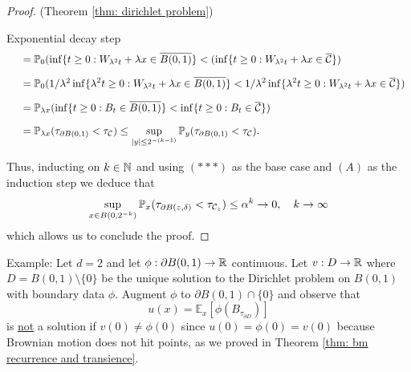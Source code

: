 \documentclass{article}
\begin{document}
\begin{proof}{(Theorem \ref{thm: dirichlet problem})}
\begin{examplesblock}{Exponential decay step}
\[\begin{array}{ll}
& = \mathbb{P}_{0}(\displaystyle\inf\{t\geq 0: W_{\lambda^{2}t}+\lambda x \in \overline{B(0, 1)}\}<(\displaystyle\inf\{t\geq 0: W_{\lambda^{2}t} + \lambda x \in \overline{ \mathcal{C}}\}) \\[10pt]
& = \mathbb{P}_{0}(1/\lambda^{2}\displaystyle\inf\{\lambda^{2}t\geq 0: W_{\lambda^{2}t}+\lambda x \in \overline{B(0, 1)}\}<1/\lambda^{2}\displaystyle\inf\{\lambda^{2}t\geq 0: W_{\lambda^{2}t} + \lambda x \in \overline{ \mathcal{C}}\}) \\[10pt]
& = \mathbb{P}_{\lambda x}(\displaystyle\inf\{t\geq 0: B_{t} \in \overline{B(0, 1)}\}<\displaystyle\inf\{t\geq 0: B_{t}\in \overline{ \mathcal{C}}\}) \\[10pt]
& = \mathbb{P}_{\lambda x}(\tau_{\partial B(0, 1)}<\tau_{ \mathcal{C}}) \leq \displaystyle\sup_{|y|\leq 2^{-(k-1)}}\mathbb{P}_{y}(\tau_{\partial B(0,1)}<\tau_{ \mathcal{C}}).
\end{array}
\]
\end{examplesblock}
Thus, inducting on $ k\in \mathbb{N}$ and using $ (***)$ as the base case and $ (A)$ as the induction step we deduce that 
\[
	\displaystyle\sup_{x\in B(0, 2^{-k})}\mathbb{P}_{x}(\tau_{\partial B(z,\delta)}<\tau_{\mathcal{C}_{z}})\leq \alpha^k\to 0, \quad k\to \infty
\]
which allows us to conclude the proof.  

\end{proof}

\begin{examplesblock}{Example: }\label{examples: 10}
	Let $ d=2$ and let $ \phi:\partial B(0,1)\to \mathbb{R}$ continuous. Let $ v:D\to \mathbb{R}$ where $ D = B(0,1)\setminus \{0\}$ be the unique solution to the Dirichlet problem on $ B(0,1)$ with boundary data $ \phi$. Augment $ \phi $ to $ \partial B(0,1)\cap \{0\}$ and observe that 
	\[
	u(x) = \mathbb{E}_{x}\left[ \phi(B_{\tau_{\partial D}}) \right]
	\]
	is \underline{not} a solution if $ v(0)\neq \phi(0)$ since $ u(0)  = \phi(0) = v(0)$ because Brownian motion does not hit points, as we proved in Theorem \ref{thm: bm recurrence and transience}.
	\end{examplesblock}
\end{document}
